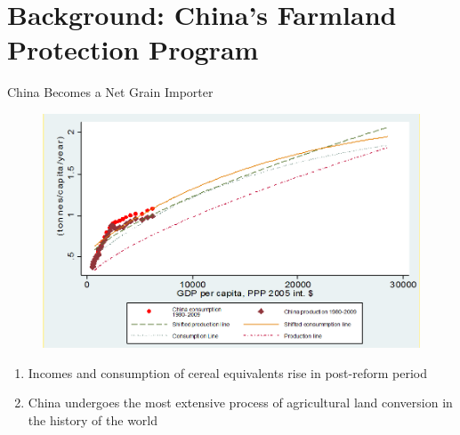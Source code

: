 \documentclass[newPxFont]{beamer}
\begin{document}
\section{Background: China's Farmland Protection Program}

\begin{frame}[c]{China Becomes a Net Grain Importer}
\begin{figure}
	\centering
	\includegraphics[width=0.65\linewidth]{Importer.png}
\end{figure}
\begin{enumerate}  
	\item{Incomes and consumption of cereal equivalents rise in post-reform period}
	\item{China undergoes the most extensive process of agricultural land conversion in the history of the world}  
\end{enumerate}  
\end{frame}
\end{document}
